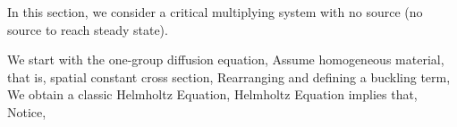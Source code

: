 \documentclass{school-22.211-notes}
\begin{document}
 \label{1g-criticality}
In this section, we consider a critical multiplying system with no source (no source to reach steady state). 

We start with the one-group diffusion equation,
Assume homogeneous material, that is, spatial constant cross section,
Rearranging and defining a buckling term, 
We obtain a classic Helmholtz Equation,
Helmholtz Equation implies that,
Notice,
\end{document}
